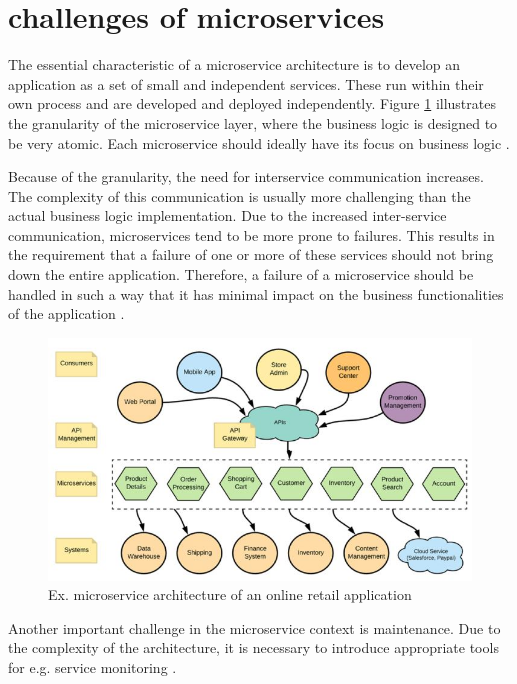 \section{challenges of microservices}

The essential characteristic of a microservice architecture is to develop an application as a set of small and independent services. These run within their own process and are developed and deployed independently. Figure \ref{fig:microservice} illustrates the granularity of the microservice layer, where the business logic is designed to be very atomic. Each microservice should ideally have its focus on business logic \cite[p. 7]{sm3}.

Because of the granularity, the need for interservice communication increases. The complexity of this communication is usually more challenging than the actual business logic implementation. Due to the increased inter-service communication, microservices tend to be more prone to failures. This results in the requirement that a failure of one or more of these services should not bring down the entire application. Therefore, a failure of a microservice should be handled in such a way that it has minimal impact on the business functionalities of the application \cite[p. 11 ff.]{sm3}.

\begin{figure}
    \includegraphics[width=\columnwidth]{img/microservice.JPG}
    \caption{Ex. microservice architecture of an online retail application \cite[p. 7]{sm3}}
    \label{fig:microservice}
\end{figure}

Another important challenge in the microservice context is maintenance. Due to the complexity of the architecture, it is necessary to introduce appropriate tools for e.g. service monitoring \cite[p. 16]{sm3}.